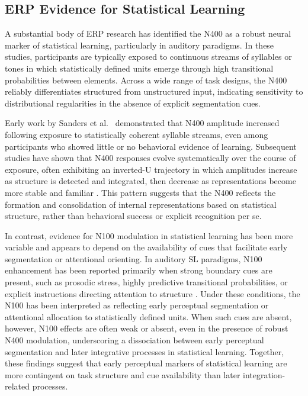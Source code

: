 \subsection*{ERP Evidence for Statistical Learning}

A substantial body of ERP research has identified the N400 as a robust neural marker of statistical learning, particularly in auditory paradigms. In these studies, participants are typically exposed to continuous streams of syllables or tones in which statistically defined units emerge through high transitional probabilities between elements. Across a wide range of task designs, the N400 reliably differentiates structured from unstructured input, indicating sensitivity to distributional regularities in the absence of explicit segmentation cues.

Early work by Sanders et al.\ \cite{sandersSegmentingNonsenseEventrelated2002} demonstrated that N400 amplitude increased following exposure to statistically coherent syllable streams, even among participants who showed little or no behavioral evidence of learning. Subsequent studies have shown that N400 responses evolve systematically over the course of exposure, often exhibiting an inverted-U trajectory in which amplitudes increase as structure is detected and integrated, then decrease as representations become more stable and familiar \cite{ablaOnlineAssessmentStatistical2008, cunilleraTimeCourseFunctional2009}. This pattern suggests that the N400 reflects the formation and consolidation of internal representations based on statistical structure, rather than behavioral success or explicit recognition per se.

In contrast, evidence for N100 modulation in statistical learning has been more variable and appears to depend on the availability of cues that facilitate early segmentation or attentional orienting. In auditory SL paradigms, N100 enhancement has been reported primarily when strong boundary cues are present, such as prosodic stress, highly predictive transitional probabilities, or explicit instructions directing attention to structure \cite{cunilleraEffectsStressStatistical2006, sandersERPStudyContinuous2003, soaresNotAllWords2020, soaresLearningWordsListening2022}. Under these conditions, the N100 has been interpreted as reflecting early perceptual segmentation or attentional allocation to statistically defined units. When such cues are absent, however, N100 effects are often weak or absent, even in the presence of robust N400 modulation, underscoring a dissociation between early perceptual segmentation and later integrative processes in statistical learning. Together, these findings suggest that early perceptual markers of statistical learning are more contingent on task structure and cue availability than later integration-related processes.

